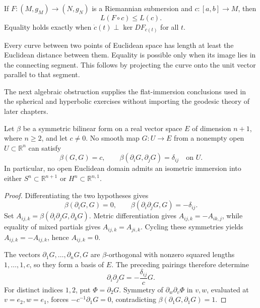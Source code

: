 \begin{remark}
  \label{rem:pet-ch1-ex-18}
  \leanok
  If $F:(M,g_M)\to(N,g_N)$ is a Riemannian submersion and
  $c:[a,b]\to M$, then
  \[
    L(F\circ c)\le L(c).
  \]
  Equality holds exactly when
  $\dot c(t)\perp\ker DF_{c(t)}$ for all $t$.
\end{remark}

\begin{remark}
  \label{rem:pet-ch1-ex-19}
  \leanok
  Every curve between two points of Euclidean space has length at least the
  Euclidean distance between them. Equality is possible only when its image
  lies in the connecting segment. This follows by projecting the curve onto
  the unit vector parallel to that segment.
\end{remark}

The next algebraic obstruction supplies the flat-immersion conclusions used in
the spherical and hyperbolic exercises without importing the geodesic theory of
later chapters.

\begin{proposition}
  \label{prop:pet-ch1-no-flat-immersion}
  \leanok
  Let $\beta$ be a symmetric bilinear form on a real vector space $E$ of
  dimension $n+1$, where $n\ge2$, and let $c\ne0$. No smooth map
  $G:U\to E$ from a nonempty open $U\subset\mathbb{R}^n$ can satisfy
  \[
    \beta(G,G)=c,
    \qquad
    \beta(\partial_iG,\partial_jG)=\delta_{ij}
    \quad\text{on }U.
  \]
  In particular, no open Euclidean domain admits an isometric immersion into
  either $S^n\subset\mathbb{R}^{n+1}$ or
  $H^n\subset\mathbb{R}^{n,1}$.
\end{proposition}

\begin{proof}
  \leanok
  \sketch
  Differentiating the two hypotheses gives
  \[
    \beta(\partial_iG,G)=0,
    \qquad
    \beta(\partial_i\partial_jG,G)=-\delta_{ij}.
  \]
  Set $A_{ij,k}=\beta(\partial_i\partial_jG,\partial_kG)$. Metric
  differentiation gives $A_{ij,k}=-A_{ik,j}$, while equality of mixed partials
  gives $A_{ij,k}=A_{ji,k}$. Cycling these symmetries yields
  $A_{ij,k}=-A_{ij,k}$, hence $A_{ij,k}=0$.

  The vectors $\partial_1G,\ldots,\partial_nG,G$ are $\beta$-orthogonal with
  nonzero squared lengths $1,\ldots,1,c$, so they form a basis of $E$.
  The preceding pairings therefore determine
  \[
    \partial_i\partial_jG=-\frac{\delta_{ij}}cG.
  \]
  For distinct indices $1,2$, put $\Phi=\partial_2G$. Symmetry of
  $\partial_w\partial_v\Phi$ in $v,w$, evaluated at $v=e_2,w=e_1$, forces
  $-c^{-1}\partial_1G=0$, contradicting
  $\beta(\partial_1G,\partial_1G)=1$.
\end{proof}

